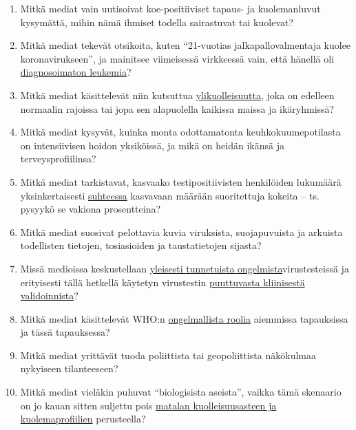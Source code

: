 \begin{enumerate}
\def\labelenumi{\arabic{enumi}.}
\item
  Mitkä mediat vain uutisoivat koe-positiiviset tapaus- ja kuolemanluvut
  kysymättä, mihin nämä ihmiset todella sairastuvat tai kuolevat?
\item
  Mitkä mediat tekevät otsikoita, kuten ``21-vuotias
  jalkapallovalmentaja kuolee koronavirukseen'', ja mainitsee
  viimeisessä virkkeessä vain, että hänellä oli
  \href{https://sports.yahoo.com/spanish-football-coach-francisco-garcia-163153573.html}{diagnosoimaton
  leukemia}?
\item
  Mitkä mediat käsittelevät niin kutsuttua
  \href{https://www.euromomo.eu/}{ylikuolleisuutta}, joka on edelleen
  normaalin rajoissa tai jopa sen alapuolella kaikissa maissa ja
  ikäryhmissä?
\item
  Mitkä mediat kysyvät, kuinka monta odottamatonta keuhkokuumepotilasta
  on intensiivisen hoidon yksiköissä, ja mikä on heidän ikänsä ja
  terveysprofiilinsa?
\item
  Mitkä mediat tarkistavat, kasvaako testipositiivisten henkilöiden
  lukumäärä yksinkertaisesti
  \href{https://multipolar-magazin.de/artikel/coronavirus-irrefuhrung-fallzahlen}{suhteessa}
  kasvavaan määrään suoritettuja kokeita -- ts. pysyykö se vakiona
  prosentteina?
\item
  Mitkä mediat suosivat pelottavia kuvia viruksista, suojapuvuista ja
  arkuista todellisten tietojen, tosiasioiden ja taustatietojen sijasta?
\item
  Missä medioissa keskustellaan
  \href{http://ncbi.nlm.nih.gov/pmc/articles/PMC2095096/}{yleisesti
  tunnetuista ongelmista}virustesteissä ja erityisesti tällä hetkellä
  käytetyn virustestin
  \href{https://www.creative-diagnostics.com/sars-cov-2-coronavirus-multiplex-rt-qpcr-kit-277854-457.htm}{puuttuvasta
  kliinisestä validoinnista}?
\item
  Mitkä mediat käsittelevät WHO:n
  \href{https://www.forbes.com/2010/02/05/world-health-organization-swine-flu-pandemic-opinions-contributors-michael-fumento.html\#24c9bce648e8}{ongelmallista
  roolia} aiemmissa tapauksissa ja tässä tapauksessa?
\item
  Mitkä mediat yrittävät tuoda poliittista tai geopoliittista näkökulmaa
  nykyiseen tilanteeseen?
\item
  Mitkä mediat vieläkin puhuvat ``biologisista aseista'', vaikka tämä
  skenaario on jo kauan sitten suljettu pois
  \href{https://www.statnews.com/2020/03/17/a-fiasco-in-the-making-as-the-coronavirus-pandemic-takes-hold-we-are-making-decisions-without-reliable-data/}{matalan
  kuolleisuusasteen ja kuolemaprofiilien} perusteella?
\end{enumerate}

